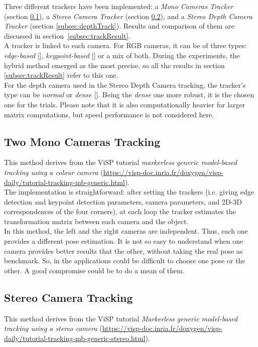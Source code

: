 Three different trackers have been implemented: a \textit{Mono Cameras Tracker} (section \ref{subsec:monoTrack}), a \textit{Stereo Camera Tracker} (section \ref{subsec:stereoTrack}), and a \textit{Stereo Depth Camera Tracker} (section \ref{subsec:depthTrack}). Results and comparison of them are discussed in \mbox{section \ref{subsec:trackResult}}.\\

A tracker is linked to each camera. For RGB cameras, it can be of three types: \textit{edge-based} [\cite{visp-edge}], \textit{keypoint-based} [\cite{visp-klt}] or a mix of both. During the experiments, the hybrid method emerged as the most precise, so all the results in section \ref{subsec:trackResult} refer to this one.\\
For the depth camera used in the Stereo Depth Camera tracking, the tracker's type can be \textit{normal} or \textit{dense} [\cite{visp-depth}]. Being the \textit{dense} one more robust, it is the chosen one for the trials. Please note that it is also computationally heavier for larger matrix computations, but speed performance is not considered here.

\subsection{Two Mono Cameras Tracking}
\label{subsec:monoTrack}
This method derives from the ViSP tutorial \textit{markerless generic model-based tracking using a colour camera}  (\url{https://visp-doc.inria.fr/doxygen/visp-daily/tutorial-tracking-mb-generic.html}).\\

The implementation is straightforward: after setting the trackers (i.e. giving edge detection and keypoint detection parameters, camera parameters, and 2D-3D correspondences of the four corners), at each loop the tracker estimates the transformation matrix between each camera and the object.\\

In this method, the left and the right cameras are independent. Thus, each one provides a different pose estimation. It is not so easy to understand when one camera provides better results that the other, without taking the real pose as benchmark. So, in the applications could be difficult to choose one pose or the other. A good compromise could be to do a mean of them.\\

\subsection{Stereo Camera Tracking}
\label{subsec:stereoTrack}
This method derives from the ViSP tutorial \textit{Markerless generic model-based tracking using a stereo camera} (\url{https://visp-doc.inria.fr/doxygen/visp-daily/tutorial-tracking-mb-generic-stereo.html}).\\

